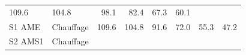 \documentclass[]{article}
\begin{document}
\begin{longtable}[]{@{}llrrrrrr@{}}
\begin{minipage}[t]{0.09\columnwidth}
109.6\strut
\end{minipage} & \begin{minipage}[t]{0.09\columnwidth}\raggedleft\strut
104.8\strut
\end{minipage} & \begin{minipage}[t]{0.09\columnwidth}\raggedleft\strut
98.1\strut
\end{minipage} & \begin{minipage}[t]{0.09\columnwidth}\raggedleft\strut
82.4\strut
\end{minipage} & \begin{minipage}[t]{0.09\columnwidth}\raggedleft\strut
67.3\strut
\end{minipage} & \begin{minipage}[t]{0.09\columnwidth}\raggedleft\strut
60.1\strut
\end{minipage}\tabularnewline
\begin{minipage}[t]{0.14\columnwidth}\raggedright\strut
S1 AME\strut
\end{minipage} & \begin{minipage}[t]{0.13\columnwidth}\raggedright\strut
Chauffage\strut
\end{minipage} & \begin{minipage}[t]{0.09\columnwidth}\raggedleft\strut
109.6\strut
\end{minipage} & \begin{minipage}[t]{0.09\columnwidth}\raggedleft\strut
104.8\strut
\end{minipage} & \begin{minipage}[t]{0.09\columnwidth}\raggedleft\strut
91.6\strut
\end{minipage} & \begin{minipage}[t]{0.09\columnwidth}\raggedleft\strut
72.0\strut
\end{minipage} & \begin{minipage}[t]{0.09\columnwidth}\raggedleft\strut
55.3\strut
\end{minipage} & \begin{minipage}[t]{0.09\columnwidth}\raggedleft\strut
47.2\strut
\end{minipage}\tabularnewline
\begin{minipage}[t]{0.14\columnwidth}\raggedright\strut
S2 AMS1\strut
\end{minipage} & \begin{minipage}[t]{0.13\columnwidth}\raggedright\strut
Chauffage\strut
\end{minipage} & \begin{minipage}[t]{0.09\columnwidth}\raggedleft\strut

\end{minipage}
\end{longtable}
\end{document}
